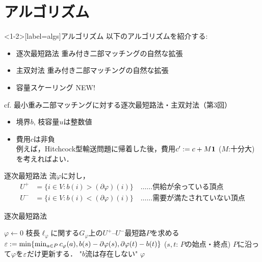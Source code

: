 \documentclass[14pt,aspectratio=169,xcolor=dvipsnames,table,onlytextwidth,dvipdfmx]{beamer}
\begin{document}
\section{アルゴリズム}
\begin{frame}<1-2>[label=algs]{アルゴリズム}
    以下のアルゴリズムを紹介する:

    \begin{itemize}[<alert@+(1)>]
        \item 逐次最短路法 
        {\footnotesize\color{gray} \dotfill 重み付き二部マッチングの自然な拡張}
        \item 主双対法
        {\footnotesize\color{gray} \dotfill 重み付き二部マッチングの自然な拡張}
        \item 容量スケーリング
        {\footnotesize\color{gray} \dotfill NEW!}
    \end{itemize}
    {\footnotesize cf. 最小重み二部マッチングに対する逐次最短路法・主双対法（第3回）}

    \bigskip
    \begin{itemize}
        \item 境界$b$, 枝容量$u$は整数値
        \item 費用$c$は非負 \\
        {\footnotesize 例えば，Hitchcock型輸送問題に帰着した後，費用$c' := c + M \mathbf{1}$ ($M$:十分大) を考えればよい．}
    \end{itemize}
\end{frame}

\begin{frame}{逐次最短路法}
    \small
     流$\varphi$に対し，
    \begin{align*}
            U^+ &= \{ i \in V : b(i) > (\partial\varphi)(i) \} \quad \dots\dots\text{供給が余っている頂点}  \\
            U^- &= \{ i \in V : b(i) < (\partial\varphi)(i) \} \quad \dots\dots\text{需要が満たされていない頂点}     
    \end{align*}

    \begin{block}{逐次最短路法}
        \begin{algorithmic}[1]
            \STATE $\varphi \gets 0$ 
                \STATE 枝長$\ell_\varphi$に関する$G_\varphi$上の$U^+$--$U^-$最短路$P$を求める \\ 
                \STATE $\varepsilon := \min\{\min_{a \in P} c_\varphi (a), b(s) - \partial\varphi(s), \partial\varphi(t) - b(t)\}$ \quad ({\footnotesize $s, t$: $P$の始点・終点})
                \STATE $P$に沿って$\varphi$を$\varepsilon$だけ更新する．
            \ELSE
                \RETURN "$b$流は存在しない"
            \ENDIF
            \ENDWHILE
            \RETURN $\varphi$
        \end{algorithmic}
    \end{block}

\end{frame}
\end{document}
